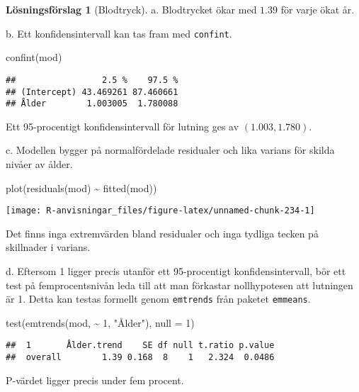 \documentclass[
]{book}
\newenvironment{Shaded}{\begin{snugshade}}{\end{snugshade}}
\newcommand{\AttributeTok}[1]{\textcolor[rgb]{0.77,0.63,0.00}{#1}}
\newcommand{\DecValTok}[1]{\textcolor[rgb]{0.00,0.00,0.81}{#1}}
\newcommand{\FunctionTok}[1]{\textcolor[rgb]{0.00,0.00,0.00}{#1}}
\newcommand{\NormalTok}[1]{#1}
\newcommand{\SpecialCharTok}[1]{\textcolor[rgb]{0.00,0.00,0.00}{#1}}
\newcommand{\StringTok}[1]{\textcolor[rgb]{0.31,0.60,0.02}{#1}}
\theoremstyle{definition}
\theoremstyle{definition}
\theoremstyle{definition}
\theoremstyle{definition}
\newtheorem{hypothesis}{Lösningsförslag}[chapter]
\theoremstyle{remark}
\begin{document}
\begin{hypothesis}[Blodtryck]
a. Blodtrycket ökar med \(1.39\) för varje ökat år.

b. Ett konfidensintervall kan tas fram med \texttt{confint}.

\begin{Shaded}
\begin{Highlighting}[]
\FunctionTok{confint}\NormalTok{(mod)}
\end{Highlighting}
\end{Shaded}

\begin{verbatim}
##                 2.5 %    97.5 %
## (Intercept) 43.469261 87.460661
## Ålder        1.003005  1.780088
\end{verbatim}

Ett 95-procentigt konfidensintervall för lutning ges av \((1.003, 1.780)\).

c. Modellen bygger på normalfördelade residualer och lika varians för skilda nivåer av ålder.

\begin{Shaded}
\begin{Highlighting}[]
\FunctionTok{plot}\NormalTok{(}\FunctionTok{residuals}\NormalTok{(mod) }\SpecialCharTok{\textasciitilde{}} \FunctionTok{fitted}\NormalTok{(mod))}
\end{Highlighting}
\end{Shaded}

\begin{center}\texttt{[image: R-anvisningar\_files/figure-latex/unnamed-chunk-234-1]} \end{center}

Det finns inga extremvärden bland residualer och inga tydliga tecken på skillnader i varians.

d. Eftersom 1 ligger precis utanför ett 95-procentigt konfidensintervall, bör ett test på femprocentsnivån leda till att man förkastar nollhypotesen att lutningen är 1. Detta kan testas formellt genom \texttt{emtrends} från paketet \texttt{emmeans}.

\begin{Shaded}
\begin{Highlighting}[]
\FunctionTok{test}\NormalTok{(}\FunctionTok{emtrends}\NormalTok{(mod, }\SpecialCharTok{\textasciitilde{}} \DecValTok{1}\NormalTok{, }\StringTok{"Ålder"}\NormalTok{), }\AttributeTok{null =} \DecValTok{1}\NormalTok{)}
\end{Highlighting}
\end{Shaded}

\begin{verbatim}
##  1       Ålder.trend    SE df null t.ratio p.value
##  overall        1.39 0.168  8    1   2.324  0.0486
\end{verbatim}

P-värdet ligger precis under fem procent.
\end{hypothesis}
\end{document}
